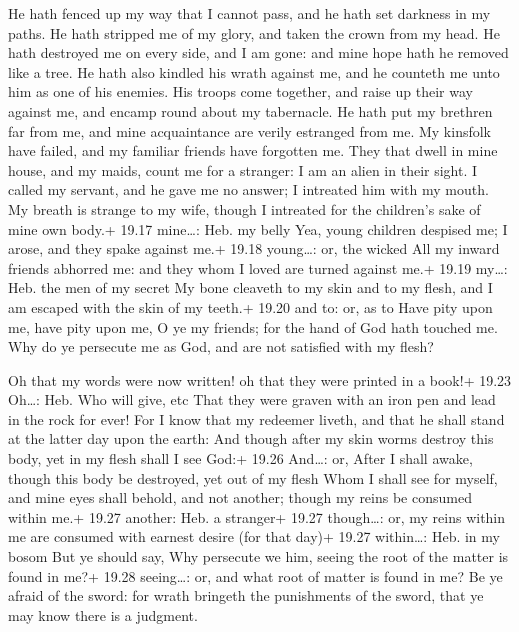  He hath fenced up my way that I cannot pass, and he hath
set darkness in my paths.  He hath stripped me of my glory,
and taken the crown from my head.  He hath destroyed me on
every side, and I am gone: and mine hope hath he removed like a tree.
 He hath also kindled his wrath against me, and he counteth
me unto him as one of his enemies.  His troops come
together, and raise up their way against me, and encamp round about my
tabernacle.  He hath put my brethren far from me, and mine
acquaintance are verily estranged from me.  My kinsfolk
have failed, and my familiar friends have forgotten me. 
They that dwell in mine house, and my maids, count me for a stranger: I
am an alien in their sight.  I called my servant, and he
gave me no answer; I intreated him with my mouth.  My
breath is strange to my wife, though I intreated for the children's sake
of mine own body.+ 19.17 mine\ldots: Heb. my belly  Yea,
young children despised me; I arose, and they spake against me.+ 19.18
young\ldots: or, the wicked  All my inward friends abhorred
me: and they whom I loved are turned against me.+ 19.19 my\ldots: Heb.
the men of my secret  My bone cleaveth to my skin and to my
flesh, and I am escaped with the skin of my teeth.+ 19.20 and to: or, as
to  Have pity upon me, have pity upon me, O ye my friends;
for the hand of God hath touched me.  Why do ye persecute
me as God, and are not satisfied with my flesh?

 Oh that my words were now written! oh that they were
printed in a book!+ 19.23 Oh\ldots: Heb. Who will give, etc
 That they were graven with an iron pen and lead in the
rock for ever!  For I know that my redeemer liveth, and
that he shall stand at the latter day upon the earth:  And
though after my skin worms destroy this body, yet in my flesh shall I
see God:+ 19.26 And\ldots: or, After I shall awake, though this body be
destroyed, yet out of my flesh  Whom I shall see for
myself, and mine eyes shall behold, and not another; though my reins be
consumed within me.+ 19.27 another: Heb. a stranger+ 19.27 though\ldots:
or, my reins within me are consumed with earnest desire (for that day)+
19.27 within\ldots: Heb. in my bosom  But ye should say,
Why persecute we him, seeing the root of the matter is found in me?+
19.28 seeing\ldots: or, and what root of matter is found in me?
 Be ye afraid of the sword: for wrath bringeth the
punishments of the sword, that ye may know there is a judgment.

